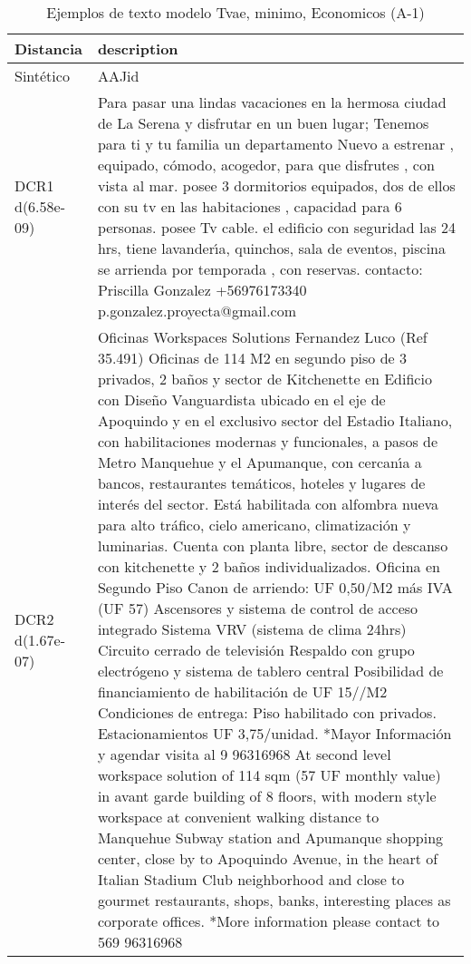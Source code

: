 \begin{table}[H]
\centering
\fontsize{10}{14}\selectfont
\caption{Ejemplos de texto modelo Tvae, minimo, Economicos (A-1)}
\label{table-example-economicos-a-1-tvae-min-text}
\begin{tabular}{|l|m{35em}|}
\hline
\rowcolor[gray]{0.8}
Distancia & description \\
\hline Sintético & AAJid \\
\hline DCR1 d(6.58e-09) & Para pasar una lindas vacaciones en la hermosa ciudad de La Serena y disfrutar en un buen lugar; Tenemos para ti y tu familia un departamento Nuevo a estrenar , equipado, c\'omodo, acogedor, para que disfrutes , con vista al mar. posee 3 dormitorios equipados, dos de ellos con su tv en las habitaciones , capacidad para 6 personas.
 posee Tv cable. el edificio con seguridad las 24 hrs, tiene lavander{\'\i}a, quinchos, sala de eventos, piscina se arrienda por temporada , con reservas. contacto: Priscilla Gonzalez  +56976173340 p.gonzalez.proyecta@gmail.com \\
\hline DCR2 d(1.67e-07) & Oficinas Workspaces Solutions Fernandez Luco (Ref 35.491) Oficinas de 114 M2 en segundo piso de 3 privados, 2 ba\~nos y sector de Kitchenette en Edificio con Dise\~no Vanguardista ubicado en el eje de Apoquindo y en el exclusivo sector del Estadio Italiano, con habilitaciones modernas y funcionales, a pasos de Metro Manquehue y el Apumanque, con cercan{\'\i}a a bancos, restaurantes tem\'aticos, hoteles y lugares de inter\'es del sector. Est\'a habilitada con alfombra nueva para alto tr\'afico, cielo americano, climatizaci\'on y luminarias. Cuenta con planta libre, sector de descanso con kitchenette y 2 ba\~nos individualizados. Oficina en Segundo Piso   Canon de arriendo: UF 0,50/M2 m\'as IVA (UF 57)   Ascensores y sistema de control de acceso integrado   Sistema VRV (sistema de clima 24hrs)   Circuito cerrado de televisi\'on   Respaldo con grupo electr\'ogeno y sistema de tablero central    Posibilidad de financiamiento de habilitaci\'on de UF 15//M2    Condiciones de entrega: Piso habilitado con privados.   Estacionamientos UF 3,75/unidad.  *Mayor Informaci\'on y agendar visita al 9 96316968 At second level workspace solution of 114 sqm (57 UF monthly value) in avant garde building of 8 floors, with modern style workspace at convenient walking distance to Manquehue Subway station and Apumanque shopping center, close by to Apoquindo Avenue, in the heart of Italian Stadium Club neighborhood and close to gourmet restaurants, shops, banks, interesting places as corporate offices. *More information please contact to 569 96316968 \\
\hline
\end{tabular}
\end{table}
